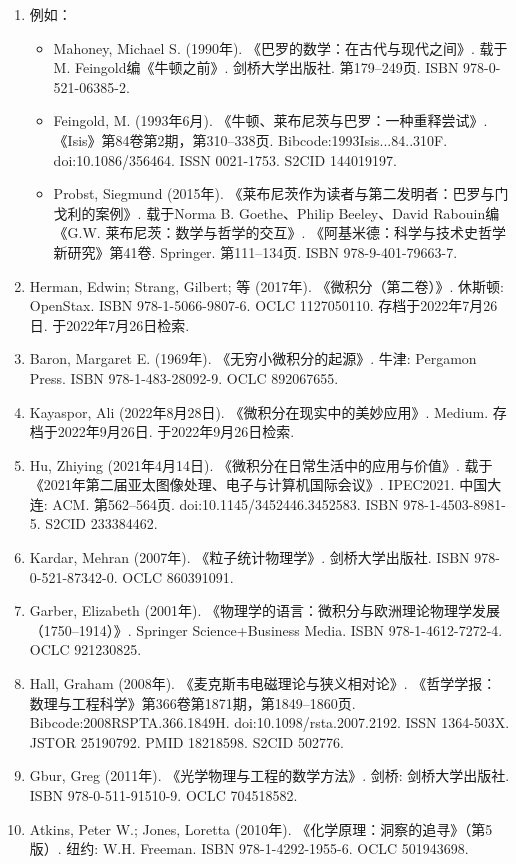 \begin{enumerate}
\item 例如：
\begin{itemize}
\item Mahoney, Michael S. (1990年). 《巴罗的数学：在古代与现代之间》. 载于M. Feingold编《牛顿之前》. 剑桥大学出版社. 第179–249页. ISBN 978-0-521-06385-2.
\item Feingold, M. (1993年6月). 《牛顿、莱布尼茨与巴罗：一种重释尝试》. 《Isis》第84卷第2期，第310–338页. Bibcode:1993Isis...84..310F. doi:10.1086/356464. ISSN 0021-1753. S2CID 144019197.
\item Probst, Siegmund (2015年). 《莱布尼茨作为读者与第二发明者：巴罗与门戈利的案例》. 载于Norma B. Goethe、Philip Beeley、David Rabouin编《G.W. 莱布尼茨：数学与哲学的交互》. 《阿基米德：科学与技术史哲学新研究》第41卷. Springer. 第111–134页. ISBN 978-9-401-79663-7.
\end{itemize}
\item Herman, Edwin; Strang, Gilbert; 等 (2017年). 《微积分（第二卷）》. 休斯顿: OpenStax. ISBN 978-1-5066-9807-6. OCLC 1127050110. 存档于2022年7月26日. 于2022年7月26日检索.
\item Baron, Margaret E. (1969年). 《无穷小微积分的起源》. 牛津: Pergamon Press. ISBN 978-1-483-28092-9. OCLC 892067655.
\item Kayaspor, Ali (2022年8月28日). 《微积分在现实中的美妙应用》. Medium. 存档于2022年9月26日. 于2022年9月26日检索.
\item Hu, Zhiying (2021年4月14日). 《微积分在日常生活中的应用与价值》. 载于《2021年第二届亚太图像处理、电子与计算机国际会议》. IPEC2021. 中国大连: ACM. 第562–564页. doi:10.1145/3452446.3452583. ISBN 978-1-4503-8981-5. S2CID 233384462.
\item Kardar, Mehran (2007年). 《粒子统计物理学》. 剑桥大学出版社. ISBN 978-0-521-87342-0. OCLC 860391091.
\item Garber, Elizabeth (2001年). 《物理学的语言：微积分与欧洲理论物理学发展（1750–1914）》. Springer Science+Business Media. ISBN 978-1-4612-7272-4. OCLC 921230825.
\item Hall, Graham (2008年). 《麦克斯韦电磁理论与狭义相对论》. 《哲学学报：数理与工程科学》第366卷第1871期，第1849–1860页. Bibcode:2008RSPTA.366.1849H. doi:10.1098/rsta.2007.2192. ISSN 1364-503X. JSTOR 25190792. PMID 18218598. S2CID 502776.
\item Gbur, Greg (2011年). 《光学物理与工程的数学方法》. 剑桥: 剑桥大学出版社. ISBN 978-0-511-91510-9. OCLC 704518582.
\item Atkins, Peter W.; Jones, Loretta (2010年). 《化学原理：洞察的追寻》（第5版）. 纽约: W.H. Freeman. ISBN 978-1-4292-1955-6. OCLC 501943698.

\end{enumerate}
